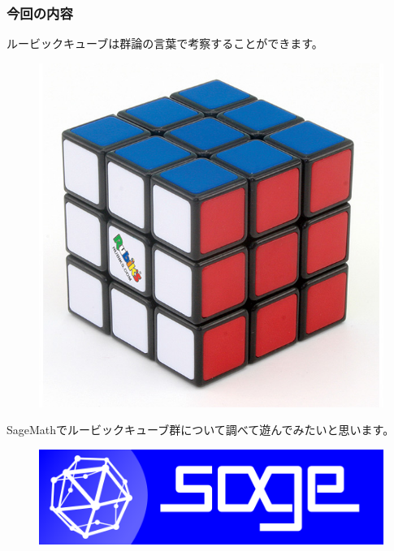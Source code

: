 \documentclass{beamer}
\begin{document}
\begin{frame}
    \frametitle{今回の内容}

    ルービックキューブは群論の言葉で考察することができます。

    \begin{figure}
        \includegraphics[scale=0.15]{images/rubik3.jpg}
    \end{figure}

    SageMathでルービックキューブ群について調べて遊んでみたいと思います。

    \begin{figure}
        \includegraphics[scale=0.2]{images/logo_sagemath+icon_oldstyle.png}
    \end{figure}
\end{frame}
\end{document}
